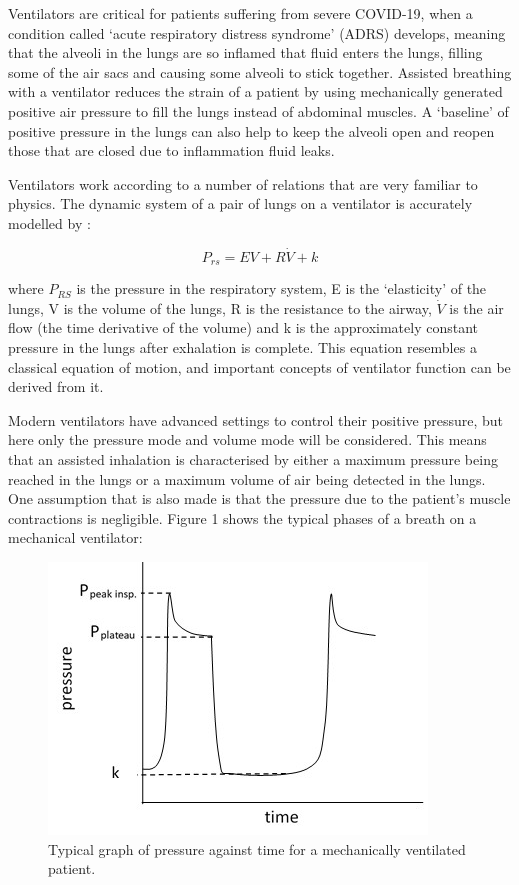 \documentclass[11pt]{report}
\begin{document}
Ventilators are critical for patients suffering from severe COVID-19, when a condition called ‘acute respiratory distress syndrome’ (ADRS) develops, meaning that the alveoli in the lungs are so inflamed that fluid enters the lungs, filling some of the air sacs and causing some alveoli to stick together. Assisted breathing with a ventilator reduces the strain of a patient by using mechanically generated positive air pressure to fill the lungs instead of abdominal muscles. A ‘baseline’ of positive pressure in the lungs can also help to keep the alveoli open and reopen those that are closed due to inflammation fluid leaks.

Ventilators work according to a number of relations that are very familiar to physics. The dynamic system of a pair of lungs on a ventilator is accurately modelled by \cite{vent1}:

\begin{equation}
    P_{rs} = EV + R\dot{V} +k
\end{equation}

where $P_{RS}$ is the pressure in the respiratory system, E is the ‘elasticity’ of the lungs, V is the volume of the lungs, R is the resistance to the airway, $\dot{V}$ is the air flow (the time derivative of the volume) and k is the approximately constant pressure in the lungs after exhalation is complete. This equation resembles a classical equation of motion, and important concepts of ventilator function can be derived from it.

Modern ventilators have advanced settings to control their positive pressure, but here only the pressure mode and volume mode will be considered. This means that an assisted inhalation is characterised by either a maximum pressure being reached in the lungs or a maximum volume of air being detected in the lungs. One assumption that is also made is that the pressure due to the patient’s muscle contractions is negligible. Figure 1 shows the typical phases of a breath on a mechanical ventilator:

\begin{figure}[ht]
\centering
\includegraphics{pressure time graph.jpg}
\caption{Typical graph of pressure against time for a mechanically ventilated patient.}

\end{figure}
\end{document}
